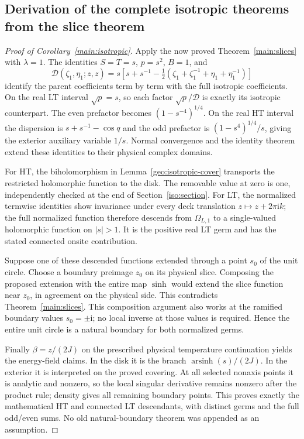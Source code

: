 \documentclass[11pt]{article}
\numberwithin{equation}{section}
\theoremstyle{definition}
\newcommand{\ii}{\mathrm i}
\begin{document}
\subsection{Derivation of the complete isotropic theorems from the slice theorem}

\begin{proof}[Proof of Corollary~\ref{main:isotropic}]
Apply the now proved Theorem~\ref{main:slices} with \(\lambda=1\).
The identities \(S=T=s\), \(p=s^2\), \(B=1\), and
\[
 \mathcal D(\zeta_1,\eta_1;z,z)
 =s\left[s+s^{-1}
 -\tfrac12(\zeta_1+\zeta_1^{-1}+\eta_1+\eta_1^{-1})\right]
\]
identify the parent coefficients term by term with the full isotropic
coefficients. On the real LT interval \(\sqrt p=s\), so each
factor \(\sqrt p/\mathcal D\) is exactly its isotropic counterpart.
The even prefactor becomes \((1-s^{-4})^{1/4}\). On the real HT
interval the dispersion is \(s+s^{-1}-\cos q\) and the odd
prefactor is \((1-s^4)^{1/4}/s\), giving the exterior auxiliary
variable \(1/s\). Normal convergence and the identity theorem
extend these identities to their physical complex domains.

For HT, the biholomorphism in Lemma~\ref{geo:isotropic-cover}
transports the restricted holomorphic function to the disk. The
removable value at zero is one, independently checked at the end
of Section~\ref{iso:section}. For LT, the normalized termwise
identities show invariance under every deck translation
\(z\mapsto z+2\pi\ii k\); the full normalized function therefore
descends from \(\Omega_{L,1}\) to a single-valued holomorphic
function on \(|s|>1\). It is the positive real LT germ and has
the stated connected onsite contribution.

Suppose one of these descended functions extended through a point
\(s_0\) of the unit circle. Choose a boundary preimage \(z_0\)
on its physical slice. Composing the proposed extension with the
entire map \(\sinh\) would extend the slice function near
\(z_0\), in agreement on the physical side. This contradicts
Theorem~\ref{main:slices}. This composition argument also works
at the ramified boundary values \(s_0=\pm\ii\); no local inverse
at those values is required. Hence the entire unit circle is a
natural boundary for both normalized germs.

Finally \(\beta=z/(2J)\) on the prescribed physical temperature
continuation yields the energy-field claims. In the disk it is
the branch \(\operatorname{arsinh}(s)/(2J)\). In the exterior it
is interpreted on the proved covering. At all selected nonaxis
points it is analytic and nonzero, so the local singular
derivative remains nonzero after the product rule; density gives
all remaining boundary points. This proves exactly the mathematical
HT and connected LT descendants, with distinct germs and the full
odd/even sums. No old natural-boundary theorem was appended as an
assumption.
\end{proof}
\end{document}
